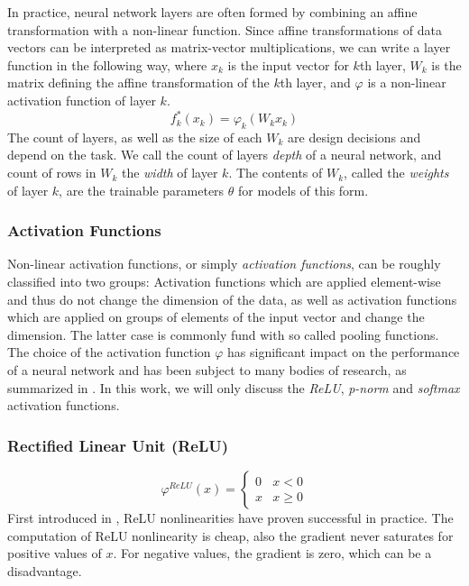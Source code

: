 In practice, neural network layers are often formed by combining an affine transformation with a non-linear function. Since affine transformations of data vectors can be interpreted as matrix-vector multiplications, we can write a layer function in the following way, where $x_k$ is the input vector for $k$th layer, $W_k$ is the matrix defining the affine transformation of the $k$th layer, and $\varphi$ is a non-linear activation function of layer $k$.
\[
f^*_k(x_k) = \varphi_k(W_k x_k)  
\]
The count of layers, as well as the size of each $W_k$ are design decisions and depend on the task. We call the count of layers \textit{depth} of a neural network, and count of rows in $W_k$ the \textit{width} of layer $k$. The contents of $W_k$, called the \textit{weights} of layer $k$, are the trainable parameters $\theta$ for models of this form.
\pagebreak
\subsubsection{Activation Functions}

Non-linear activation functions, or simply \textit{activation functions}, can be roughly classified into two groups: Activation functions which are applied element-wise and thus do not change the dimension of the data, as well as activation functions which are applied on groups of elements of the input vector and change the dimension. The latter case is commonly fund with so called pooling functions. The choice of the activation function $\varphi$ has significant impact on the performance of a neural network and has been subject to many bodies of research, as summarized in \cite{thoma2017analysis}. In this work, we will only discuss the \textit{ReLU}, \textit{p-norm} and \textit{softmax} activation functions. 

\subsubsection*{Rectified Linear Unit (ReLU)}
\begin{minipage}{0.45\textwidth}
	\[\varphi^{ReLU}(x) = \begin{cases}
	0 & x < 0 \\
	x & x \geq 0
	\end{cases}\]
	First introduced in \cite{krizhevsky2012imagenet}, ReLU nonlinearities have proven successful in practice. The computation of ReLU nonlinearity is cheap, also the gradient never saturates for positive values of $x$. For negative values, the gradient is zero, which can be a disadvantage.  
\end{minipage}
\hfill
\begin{minipage}{0.45\textwidth}
\end{minipage}

